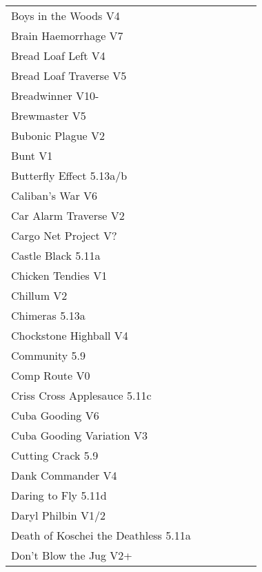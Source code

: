\begin{flushleft}
\begin{center}
\begin{supertabular}{p{0.76\linewidth}p{0.08\linewidth}}
Boys in the Woods V4 & \pageref{rt:Boys in the Woods} \\
Brain Haemorrhage V7 & \pageref{vr:Brain Haemorrhage} \\
Bread Loaf Left V4 & \pageref{rt:Bread Loaf Left} \\
Bread Loaf Traverse V5 & \pageref{rt:Bread Loaf Traverse} \\
Breadwinner V10- & \pageref{rt:Breadwinner} \\
Brewmaster V5 & \pageref{rt:Brewmaster} \\
Bubonic Plague V2 & \pageref{rt:Bubonic Plague} \\
Bunt V1 & \pageref{rt:Bunt} \\
Butterfly Effect 5.13a/b & \pageref{rt:Butterfly Effect} \\
Caliban's War V6 & \pageref{rt:Caliban's War} \\
Car Alarm Traverse V2 & \pageref{rt:Car Alarm Traverse} \\
Cargo Net Project V? & \pageref{rt:Cargo Net Project} \\
Castle Black 5.11a & \pageref{rt:Castle Black} \\
Chicken Tendies V1 & \pageref{rt:Chicken Tendies} \\
Chillum V2 & \pageref{rt:Chillum} \\
Chimeras 5.13a & \pageref{rt:Chimeras} \\
Chockstone Highball V4 & \pageref{rt:Chockstone Highball} \\
Community 5.9 & \pageref{rt:Community} \\
Comp Route V0 & \pageref{rt:Comp Route} \\
Criss Cross Applesauce 5.11c & \pageref{rt:Criss Cross Applesauce} \\
Cuba Gooding V6 & \pageref{rt:Cuba Gooding} \\
Cuba Gooding Variation V3 & \pageref{vr:Cuba Gooding Variation} \\
Cutting Crack 5.9 & \pageref{rt:Cutting Crack} \\
Dank Commander V4 & \pageref{rt:Dank Commander} \\
Daring to Fly 5.11d & \pageref{rt:Daring to Fly} \\
Daryl Philbin V1/2 & \pageref{rt:Daryl Philbin} \\
Death of Koschei the Deathless 5.11a & \pageref{rt:Death of Koschei the Deathless} \\
Don't Blow the Jug V2+ & \pageref{rt:Don't Blow the Jug} \\

\end{supertabular}
\end{center}
\end{flushleft}
